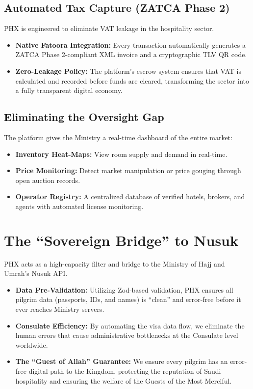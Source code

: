 \documentclass[11pt,a4paper]{article}
\begin{document}
\subsection{Automated Tax Capture (ZATCA Phase 2)}

PHX is engineered to eliminate VAT leakage in the hospitality sector.

\begin{itemize}
  \item \textbf{Native Fatoora Integration:} Every transaction automatically generates a ZATCA Phase 2-compliant XML invoice and a cryptographic TLV QR code.
  \item \textbf{Zero-Leakage Policy:} The platform's escrow system ensures that VAT is calculated and recorded before funds are cleared, transforming the sector into a fully transparent digital economy.
\end{itemize}

\subsection{Eliminating the Oversight Gap}

The platform gives the Ministry a real-time dashboard of the entire market:

\begin{itemize}
  \item \textbf{Inventory Heat-Maps:} View room supply and demand in real-time.
  \item \textbf{Price Monitoring:} Detect market manipulation or price gouging through open auction records.
  \item \textbf{Operator Registry:} A centralized database of verified hotels, brokers, and agents with automated license monitoring.
\end{itemize}

\section{The ``Sovereign Bridge'' to Nusuk}

PHX acts as a high-capacity filter and bridge to the Ministry of Hajj and Umrah's Nusuk API.

\begin{itemize}
  \item \textbf{Data Pre-Validation:} Utilizing Zod-based validation, PHX ensures all pilgrim data (passports, IDs, and names) is ``clean'' and error-free before it ever reaches Ministry servers.
  \item \textbf{Consulate Efficiency:} By automating the visa data flow, we eliminate the human errors that cause administrative bottlenecks at the Consulate level worldwide.
  \item \textbf{The ``Guest of Allah'' Guarantee:} We ensure every pilgrim has an error-free digital path to the Kingdom, protecting the reputation of Saudi hospitality and ensuring the welfare of the Guests of the Most Merciful.
\end{itemize}
\end{document}
